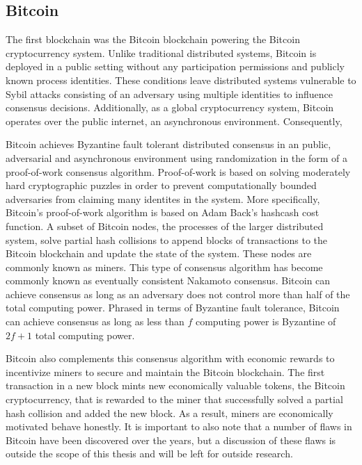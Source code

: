 \subsection{Bitcoin}

The first blockchain was the Bitcoin blockchain\cite{bitcoin} powering the
Bitcoin cryptocurrency system. Unlike traditional distributed systems, Bitcoin
is deployed in a public setting without any participation permissions and
publicly known process identities. These conditions leave distributed systems
vulnerable to Sybil attacks consisting of
an adversary using multiple identities to influence consensus
decisions\cite{sybil}. Additionally, as a global cryptocurrency system, Bitcoin
operates over the public internet, an asynchronous environment. Consequently,

Bitcoin achieves Byzantine fault tolerant distributed consensus in an public, adversarial
and asynchronous environment using randomization in the form of a proof-of-work
consensus algorithm. Proof-of-work is based on solving moderately hard
cryptographic puzzles in order to prevent computationally bounded adversaries
from claiming many identites in the system\cite{anonymousByzantine}. More specifically, Bitcoin's
proof-of-work algorithm is based on Adam Back's hashcash cost function. A subset
of Bitcoin nodes, the processes of the larger distributed system, solve partial
hash collisions to append blocks of transactions to the Bitcoin blockchain and
update the state of the system. These nodes are commonly known as miners. This
type of consensus algorithm has become commonly known as eventually consistent
Nakamoto consensus\cite{nakamotoConsensus}. Bitcoin can achieve consensus as
long as an adversary does not control more than half of the total computing
power. Phrased in terms of Byzantine fault tolerance, Bitcoin can achieve
consensus as long as less than $f$ computing power is Byzantine of $2f + 1$
total computing power.

Bitcoin also complements this consensus algorithm with economic rewards to
incentivize miners to secure and maintain the Bitcoin blockchain. The first
transaction in a new block mints new economically valuable tokens, the Bitcoin
cryptocurrency, that is rewarded to the miner that successfully solved a partial
hash collision and added the new block\cite{bitcoin}. As a result, miners are
economically motivated behave honestly. It is important to also note that a number of
flaws in Bitcoin have been discovered over the years, but a discussion of these
flaws is outside the scope of this thesis and will be left for outside research.

